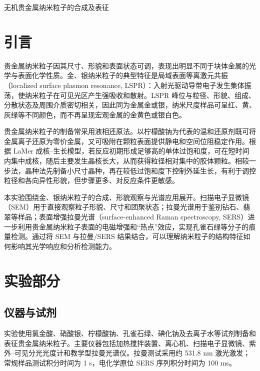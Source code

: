 \documentclass[a4paper]{article}
\newcommand{\zihaoSan}{\fontsize{16pt}{24pt}\selectfont}
\newcommand{\zihaoWu}{\fontsize{10.5pt}{16pt}\selectfont}
\begin{document}
\zihaoWu

\begin{center}
  {\zihaoSan\heiti 无机贵金属纳米粒子的合成及表征}
\end{center}
\vspace{6pt}

\section{引言}
\vspace{-0.5em}

贵金属纳米粒子因其尺寸、形貌和表面状态可调，表现出明显不同于块体金属的光学与表面化学性质。金、银纳米粒子的典型特征是局域表面等离激元共振（localized surface plasmon resonance, LSPR）：入射光驱动导带电子发生集体振荡，使纳米粒子在可见光区产生强吸收和散射。LSPR 峰位与粒径、形貌、组成、分散状态及周围介质密切相关，因此同为金属金或银，纳米尺度样品可呈红、黄、灰绿等不同颜色，而不再呈现宏观金属的金黄色或银白色\cite{Willets2007,Mayer2011}。

贵金属纳米粒子的制备常采用液相还原法。以柠檬酸钠为代表的温和还原剂既可将金属离子还原为零价金属，又可吸附在颗粒表面提供静电和空间位阻稳定作用。根据 LaMer 成核--生长模型，若反应初期形成足够高的单体过饱和度，可在短时间内集中成核，随后主要发生晶核长大，从而获得粒径相对集中的胶体颗粒。相较一步法，晶种法先制备小尺寸晶种，再在较低过饱和度下控制外延生长，有利于调控粒径和各向异性形貌，但步骤更多、对反应条件更敏感\cite{Pratap2025,CoreShell2025}。

本实验围绕金、银纳米粒子的合成、形貌观察与光谱应用展开。扫描电子显微镜（SEM）用于直接观察粒子形貌、尺寸和团聚状态；拉曼光谱用于鉴别钻石、翡翠等样品；表面增强拉曼光谱（surface-enhanced Raman spectroscopy, SERS）进一步利用贵金属纳米粒子表面的电磁增强和“热点”效应，实现孔雀石绿等分子的痕量检测\cite{Zhou2023,Deniz2019}。通过将 SEM 与拉曼/SERS 结果结合，可以理解纳米粒子的结构特征如何影响其光学响应和分析检测能力。

\section{实验部分}
\vspace{-0.5em}

\subsection{仪器与试剂}

实验使用氯金酸、硝酸银、柠檬酸钠、孔雀石绿、碘化钠及去离子水等试剂制备和表征贵金属纳米粒子。主要仪器包括加热搅拌装置、离心机、扫描电子显微镜、紫外--可见分光光度计和教学型拉曼光谱仪。拉曼测试采用约 531.8 nm 激光激发；常规样品测试积分时间为 1 s，电化学原位 SERS 序列积分时间为 100 ms。
\end{document}
